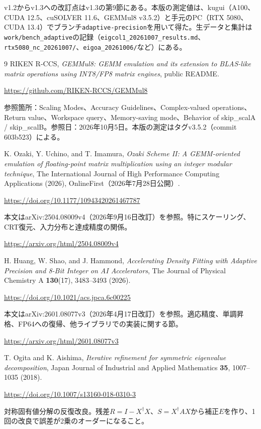 \documentclass[a4paper,11pt]{ltjsarticle}
\newcommand{\code}[1]{\texttt{#1}}
\begin{document}
\medskip
v1.2からv1.3への改訂点はv1.3の第9節にある。本版の測定値は、kugui（A100、CUDA 12.5、cuSOLVER 11.6、GEMMul8 v3.5.2）と手元のPC（RTX 5080、CUDA 13.4）でブランチ\code{adaptive-precision}を用いて得た。生データと集計は\code{work/bench\_adaptive}の記録（\code{eigcol1\_20261007\_results.md}、\code{rtx5080\_nc\_20261007/}、\code{eigoa\_20261006/}など）にある。

\clearpage
\begin{thebibliography}{9}
\small
{}
RIKEN R-CCS, \textit{GEMMul8: GEMM emulation and its extension to BLAS-like matrix operations using INT8/FP8 matrix engines}, public README.\par
\url{https://github.com/RIKEN-RCCS/GEMMul8}\par
参照箇所：Scaling Modes、Accuracy Guidelines、Complex-valued operations、Return value、Workspace query、Memory-saving mode、Behavior of skip\_scalA / skip\_scalB。参照日：2026年10月5日。本版の測定はタグv3.5.2（commit 603b523）による。

K. Ozaki, Y. Uchino, and T. Imamura,
\textit{Ozaki Scheme II: A GEMM-oriented emulation of floating-point matrix multiplication using an integer modular technique},
The International Journal of High Performance Computing Applications (2026), OnlineFirst（2026年7月28日公開）.\par
\url{https://doi.org/10.1177/10943420261467787}\par
本文はarXiv:2504.08009v4（2026年9月16日改訂）を参照。特にスケーリング、CRT復元、入力分布と達成精度の関係。\par
\url{https://arxiv.org/html/2504.08009v4}

H. Huang, W. Shao, and J. Hammond,
\textit{Accelerating Density Fitting with Adaptive Precision and 8-Bit Integer on AI Accelerators},
The Journal of Physical Chemistry A \textbf{130}(17), 3483--3493 (2026).\par
\url{https://doi.org/10.1021/acs.jpca.6c00225}\par
本文はarXiv:2601.08077v3（2026年4月17日改訂）を参照。適応精度、単調昇格、FP64への復帰、他ライブラリでの実装に関する節。\par
\url{https://arxiv.org/html/2601.08077v3}

T. Ogita and K. Aishima,
\textit{Iterative refinement for symmetric eigenvalue decomposition},
Japan Journal of Industrial and Applied Mathematics \textbf{35}, 1007--1035 (2018).\par
\url{https://doi.org/10.1007/s13160-018-0310-3}\par
対称固有値分解の反復改良。残差$R=I-X^{\dagger}X$、$S=X^{\dagger}AX$から補正$E$を作り、1回の改良で誤差が2乗のオーダーになること。


\end{thebibliography}
\end{document}
